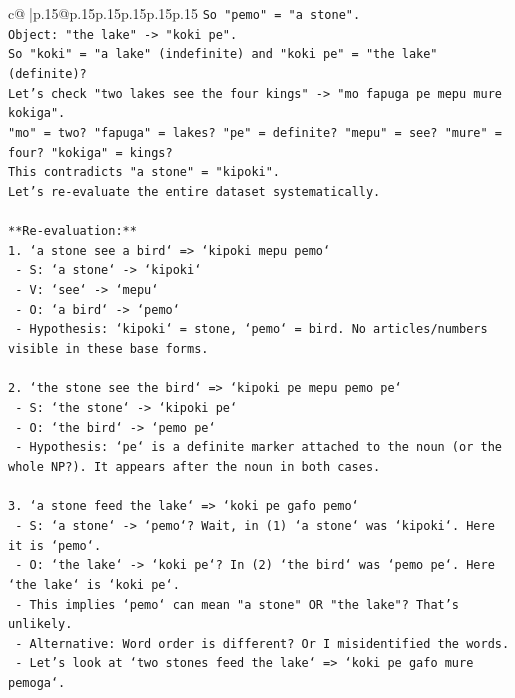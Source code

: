 \documentclass{article}
\begin{document}
{\begin{supertabular}{c@{$\;$}|p{.15\linewidth}@{}p{.15\linewidth}p{.15\linewidth}p{.15\linewidth}p{.15\linewidth}p{.15\linewidth}}
{{{\texttt{So "pemo" = "a stone".} \\
\texttt{Object: "the lake" {-}> "koki pe".} \\
\texttt{So "koki" = "a lake" (indefinite) and "koki pe" = "the lake" (definite)?} \\
\texttt{Let's check "two lakes see the four kings" {-}> "mo fapuga pe mepu mure kokiga".} \\
\texttt{"mo" = two? "fapuga" = lakes? "pe" = definite? "mepu" = see? "mure" = four? "kokiga" = kings?} \\
\texttt{This contradicts "a stone" = "kipoki".} \\
\texttt{Let's re{-}evaluate the entire dataset systematically.} \\
\\ 
\texttt{**Re{-}evaluation:**} \\
\texttt{1. `a stone see a bird` => `kipoki mepu pemo`} \\
\texttt{   {-} S: `a stone` {-}> `kipoki`} \\
\texttt{   {-} V: `see` {-}> `mepu`} \\
\texttt{   {-} O: `a bird` {-}> `pemo`} \\
\texttt{   {-} Hypothesis: `kipoki` = stone, `pemo` = bird. No articles/numbers visible in these base forms.} \\
\\ 
\texttt{2. `the stone see the bird` => `kipoki pe mepu pemo pe`} \\
\texttt{   {-} S: `the stone` {-}> `kipoki pe`} \\
\texttt{   {-} O: `the bird` {-}> `pemo pe`} \\
\texttt{   {-} Hypothesis: `pe` is a definite marker attached to the noun (or the whole NP?). It appears after the noun in both cases.} \\
\\ 
\texttt{3. `a stone feed the lake` => `koki pe gafo pemo`} \\
\texttt{   {-} S: `a stone` {-}> `pemo`? Wait, in (1) `a stone` was `kipoki`. Here it is `pemo`.} \\
\texttt{   {-} O: `the lake` {-}> `koki pe`? In (2) `the bird` was `pemo pe`. Here `the lake` is `koki pe`.} \\
\texttt{   {-} This implies `pemo` can mean "a stone" OR "the lake"? That's unlikely.} \\
\texttt{   {-} Alternative: Word order is different? Or I misidentified the words.} \\
\texttt{   {-} Let's look at `two stones feed the lake` => `koki pe gafo mure pemoga`.} \\
}}}
\end{supertabular}}
\end{document}
